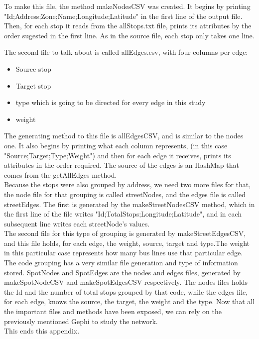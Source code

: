 \documentclass[12pt]{article}
\begin{document}
	To make this file, the method makeNodesCSV was created.
	It begins by printing "Id;Address;Zone;Name;Longitude;Latitude" in the first line of the output file. Then, for each stop it reads from the allStops.txt file, prints its attributes by the order sugested in the first line. As in the source file, each stop only takes one line.
	
	The second file to talk about is called allEdges.csv, with four columns per edge:
	
	\begin{itemize}
		\item Source stop
		\item Target stop
		\item type which is going to be directed for every edge in this study
		\item weight 
	\end{itemize}
	
	The generating method to this file is allEdgesCSV, and is similar to the nodes one.
	It also begins by printing what each column represents, (in this case "Source;Target;Type;Weight") and then for each edge it receives, prints its attributes in the order required. The source of the edges is an HashMap that comes from the getAllEdges method.\\
	Because the stops were also grouped by address, we need two more files for that, the node file for that grouping is called streetNodes, and the edges file is called streetEdges. The first is generated by the makeStreetNodesCSV method, which in the first line of the file writes "Id;TotalStops;Longitude;Latitude", and in each subsequent line writes each streetNode's values. \\
	The second file for this type of grouping  is generated by makeStreetEdgesCSV, and this file holds, for each edge, the weight, source, target and type.The weight in this particular case represents how many bus lines use that particular edge.\\
	The code grouping has a very similar file generation and type of information stored. SpotNodes and SpotEdges are the nodes and edges files, generated by makeSpotNodeCSV and makeSpotEdgesCSV respectively. The nodes files holds the Id and the number of total stops grouped by that code, while the edges file, for each edge, knows the source, the target, the weight and the type.
	Now that all the important files and methods have been exposed, we can rely on the previously mentioned Gephi to study the network.\\

This ends this appendix.
\end{document}
